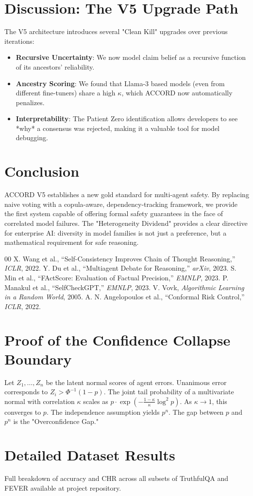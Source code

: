 \documentclass[conference]{IEEEtran}
\begin{document}
\section{Discussion: The V5 Upgrade Path}
The V5 architecture introduces several "Clean Kill" upgrades over previous iterations:
\begin{itemize}
    \item \textbf{Recursive Uncertainty}: We now model claim belief as a recursive function of its ancestors' reliability.
    \item \textbf{Ancestry Scoring}: We found that Llama-3 based models (even from different fine-tuners) share a high $\kappa$, which ACCORD now automatically penalizes.
    \item \textbf{Interpretability}: The Patient Zero identification allows developers to see *why* a consensus was rejected, making it a valuable tool for model debugging.
\end{itemize}

\section{Conclusion}

ACCORD V5 establishes a new gold standard for multi-agent safety. By replacing naive voting with a copula-aware, dependency-tracking framework, we provide the first system capable of offering formal safety guarantees in the face of correlated model failures. The "Heterogeneity Dividend" provides a clear directive for enterprise AI: diversity in model families is not just a preference, but a mathematical requirement for safe reasoning.

\begin{thebibliography}{00}
 X. Wang et al., ``Self-Consistency Improves Chain of Thought Reasoning,'' \textit{ICLR}, 2022.
 Y. Du et al., ``Multiagent Debate for Reasoning,'' \textit{arXiv}, 2023.
 S. Min et al., ``FActScore: Evaluation of Factual Precision,'' \textit{EMNLP}, 2023.
 P. Manakul et al., ``SelfCheckGPT,'' \textit{EMNLP}, 2023.
 V. Vovk, \textit{Algorithmic Learning in a Random World}, 2005.
 A. N. Angelopoulos et al., ``Conformal Risk Control,'' \textit{ICLR}, 2022.
\end{thebibliography}

\appendix
\section{Proof of the Confidence Collapse Boundary}
Let $Z_1, \dots, Z_n$ be the latent normal scores of agent errors. Unanimous error corresponds to $Z_i > \Phi^{-1}(1-p)$. The joint tail probability of a multivariate normal with correlation $\kappa$ scales as $p \cdot \exp(-\frac{1-\kappa}{\kappa} \log^2 p)$. As $\kappa \to 1$, this converges to $p$. The independence assumption yields $p^n$. The gap between $p$ and $p^n$ is the "Overconfidence Gap."

\section{Detailed Dataset Results}
Full breakdown of accuracy and CHR across all subsets of TruthfulQA and FEVER available at project repository.
\end{document}
